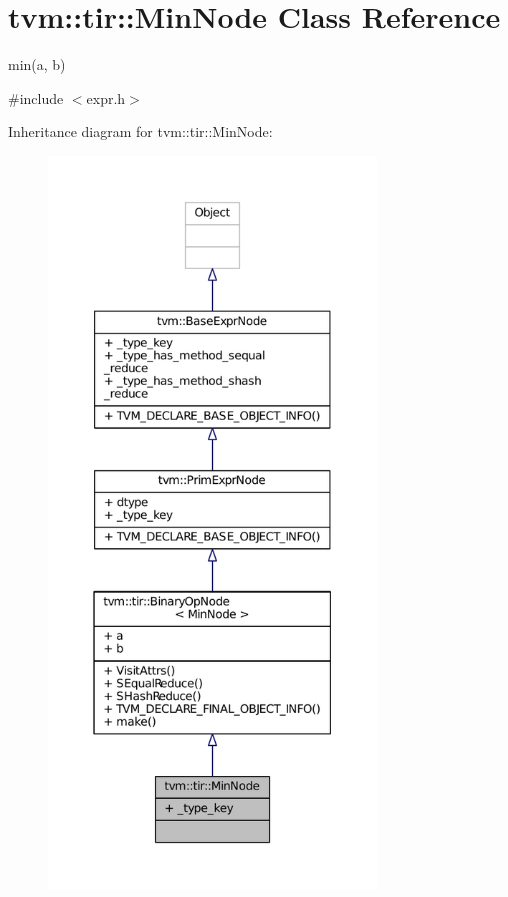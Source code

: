 \hypertarget{classtvm_1_1tir_1_1MinNode}{}\section{tvm\+:\+:tir\+:\+:Min\+Node Class Reference}
\label{classtvm_1_1tir_1_1MinNode}


min(a, b)  




{\ttfamily \#include $<$expr.\+h$>$}



Inheritance diagram for tvm\+:\+:tir\+:\+:Min\+Node\+:
\nopagebreak
\begin{figure}[H]
\begin{center}
\leavevmode
\includegraphics[height=550pt]{classtvm_1_1tir_1_1MinNode__inherit__graph}
\end{center}
\end{figure}



